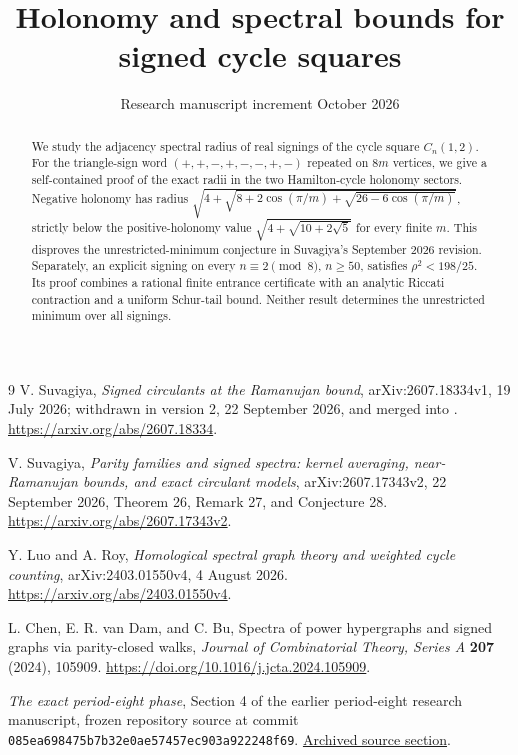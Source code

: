 \documentclass[11pt]{article}
\title{Holonomy and spectral bounds for signed cycle squares}
\author{}
\date{Research manuscript increment\quad 5 October 2026}
\theoremstyle{remark}\newtheorem{remark}[theorem]{Remark}
\begin{document}
\maketitle
\begin{abstract}
We study the adjacency spectral radius of real signings of the cycle square
$C_n(1,2)$. For the triangle-sign word $(+,+,-,+,-,-,+,-)$ repeated on
$8m$ vertices, we give a self-contained proof of the exact radii in the two
Hamilton-cycle holonomy sectors. Negative holonomy has radius
$\sqrt{4+\sqrt{8+2\cos(\pi/m)+\sqrt{26-6\cos(\pi/m)}}}$,
strictly below the positive-holonomy value
$\sqrt{4+\sqrt{10+2\sqrt5}}$ for every finite $m$. This disproves the
unrestricted-minimum conjecture in Suvagiya's September 2026 revision.
Separately, an explicit signing on every $n\equiv2\pmod8$, $n\ge50$,
satisfies $\rho^2<198/25$. Its proof combines a rational finite entrance
certificate with an analytic Riccati contraction and a uniform Schur-tail
bound. Neither result determines the unrestricted minimum over all signings.
\end{abstract}





\appendix


\begin{thebibliography}{9}
V. Suvagiya,
\emph{Signed circulants at the Ramanujan bound},
arXiv:2607.18334v1, 19 July 2026;
withdrawn in version 2, 22 September 2026, and merged into
\cite{Suvagiya2026}.
\url{https://arxiv.org/abs/2607.18334}.

V. Suvagiya,
\emph{Parity families and signed spectra: kernel averaging,
near-Ramanujan bounds, and exact circulant models},
arXiv:2607.17343v2, 22 September 2026,
Theorem 26, Remark 27, and Conjecture 28.
\url{https://arxiv.org/abs/2607.17343v2}.

Y. Luo and A. Roy,
\emph{Homological spectral graph theory and weighted cycle counting},
arXiv:2403.01550v4, 4 August 2026.
\url{https://arxiv.org/abs/2403.01550v4}.

L. Chen, E. R. van Dam, and C. Bu,
Spectra of power hypergraphs and signed graphs via parity-closed walks,
\emph{Journal of Combinatorial Theory, Series A} \textbf{207} (2024),
105909.
\url{https://doi.org/10.1016/j.jcta.2024.105909}.

\emph{The exact period-eight phase}, Section 4 of the earlier period-eight
research manuscript, frozen repository source at commit
\texttt{085ea698475b7b32e0ae57457ec903a922248f69}.
\href{https://github.com/whzy3185/math/blob/085ea698475b7b32e0ae57457ec903a922248f69/research/paper_strengthening/manuscript_period8_jgt/sections_en/04_period8_exact.tex}{Archived source section}.

\end{thebibliography}
\end{document}
